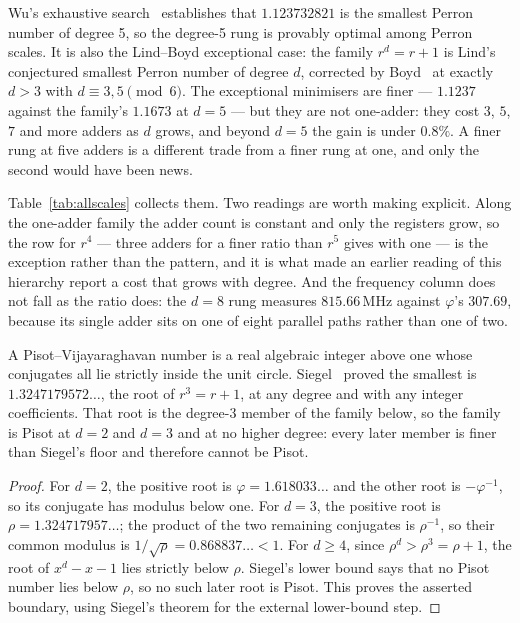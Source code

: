Wu's exhaustive search~\cite{wu2010} establishes that $1.123732821$ is the
smallest Perron number of degree 5, so the degree-5 rung is provably optimal
among Perron scales. It is also the Lind--Boyd exceptional case: the family
$r^d=r+1$ is Lind's conjectured smallest Perron number of degree $d$, corrected
by Boyd~\cite{boyd1985} at exactly $d>3$ with $d\equiv3,5 \pmod 6$. The
exceptional minimisers are finer --- $1.1237$ against the family's $1.1673$ at
$d=5$ --- but they are not one-adder: they cost $3$, $5$, $7$ and more adders as
$d$ grows, and beyond $d=5$ the gain is under $0.8\%$. A finer rung at five
adders is a different trade from a finer rung at one, and only the second would
have been news.

Table~\ref{tab:allscales} collects them. Two readings are worth making
explicit. Along the one-adder family the adder count is constant and only the
registers grow, so the row for $r^4$ --- three adders for a finer ratio than
$r^5$ gives with one --- is the exception rather than the pattern, and it is what
made an earlier reading of this hierarchy report a cost that grows with degree.
And the frequency column does not fall as the ratio does: the $d=8$ rung
measures $815.66$\,MHz against $\varphi$'s $307.69$, because its single adder
sits on one of eight parallel paths rather than one of two.

\begin{theorem}\label{thm:siegel}
A Pisot--Vijayaraghavan number is a real algebraic integer above one whose
conjugates all lie strictly inside the unit circle. Siegel~\cite{siegel1944}
proved the smallest is $1.3247179572\ldots$, the root of $r^3=r+1$, at any
degree and with any integer coefficients. That root is the degree-3 member of
the family below, so the family is Pisot at $d=2$ and $d=3$ and at no higher
degree: every later member is finer than Siegel's floor and therefore cannot be
Pisot.
\end{theorem}
\begin{proof}
For $d=2$, the positive root is $\varphi=1.618033\ldots$ and the other root is
$-\varphi^{-1}$, so its conjugate has modulus below one. For $d=3$, the
positive root is $\rho=1.324717957\ldots$; the product of the two remaining
conjugates is $\rho^{-1}$, so their common modulus is
$1/\sqrt{\rho}=0.868837\ldots<1$. For $d\ge4$, since
$\rho^d>\rho^3=\rho+1$, the root of $x^d-x-1$ lies strictly below $\rho$.
Siegel's lower bound says that no Pisot number lies below $\rho$, so no such
later root is Pisot. This proves the asserted boundary, using Siegel's theorem
for the external lower-bound step.
\end{proof}

